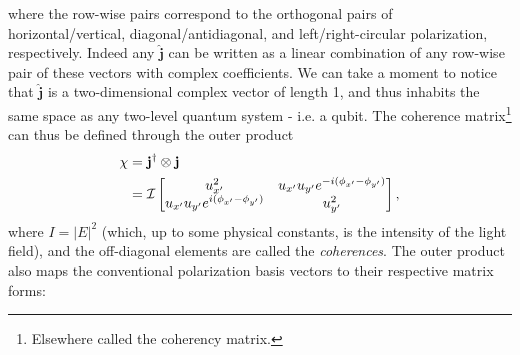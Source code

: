 	\noindent where the row-wise pairs correspond to the orthogonal pairs of horizontal/vertical, diagonal/antidiagonal, and left/right-circular polarization, respectively.
	Indeed any $\hat{\mathbf{j}}$ can be written as a linear combination of any row-wise pair of these vectors with complex coefficients.
	We can take a moment to notice that $\hat{\mathbf{j}}$ is a two-dimensional complex vector of length 1, and thus inhabits the same space as any two-level quantum system - i.e. a qubit.
	The coherence matrix\footnote{Elsewhere called the coherency matrix.} can thus be defined through the outer product
	\begin{align}
		\mathbf{\chi} &= \mathbf{j}^\dagger\otimes\mathbf{j} \\
		 &= \mathcal{I} \begin{bmatrix} u_{x'}^2 & u_{x'} u_{y'} e^{-i(\phi_{x'}-\phi_{y'})} \\ u_{x'} u_{y'} e^{i(\phi_{x'}-\phi_{y'})} & u_{y'}^2\end{bmatrix},
	\end{align}
	where $I=|E|^2$ (which, up to some physical constants, is the intensity of the light field), and the off-diagonal elements are called the \emph{coherences}. 
	The outer product also maps the conventional polarization basis vectors to their respective matrix forms:

